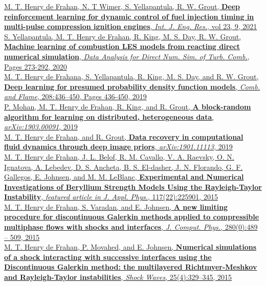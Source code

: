 \documentclass[11pt,letterpaper]{article}
\begin{document}
\href{https://doi.org/10.1177/14680874211019345}{M. T. Henry de Frahan, N. T Wimer, S. Yellapantula, R. W. Grout, \textbf{Deep reinforcement learning for dynamic control of fuel injection timing in multi-pulse compression ignition engines}, \textit{Int. J. Eng. Res.}, vol 23, 9, 2021}\\[2ex]
\href{https://link.springer.com/chapter/10.1007/978-3-030-44718-2_14}{S. Yellapantula, M. T. Henry de Frahan, R. King, M. S. Day, R. W. Grout, \textbf{Machine learning of combustion LES models from reacting direct numerical simulation}, \textit{Data Analysis for Direct Num. Sim. of Turb. Comb.}, Pages 273-292, 2020}\\[2ex]
\href{https://doi.org/10.1016/j.combustflame.2019.07.015}{M. T. Henry de Frahana, S. Yellapantula, R. King, M. S. Day, and R. W. Grout, \textbf{Deep learning for presumed probability density function models}, \textit{Comb. and Flame}, 208:436--450, Pages 436-450, 2019}\\[2ex]%
\href{http://arxiv.org/abs/1903.00091}{P. Mohan, M. T. Henry de Frahan, R. King, and R. Grout, \textbf{A block-random algorithm for learning on distributed, heterogeneous data}, \textit{arXiv:1903.00091}, 2019}\\[2ex]%
\href{http://arxiv.org/abs/1901.11113}{M. T. Henry de Frahan, and R. Grout, \textbf{Data recovery in computational fluid dynamics through deep image priors}, \textit{arXiv:1901.11113}, 2019}\\[2ex]%
\href{http://dx.doi.org/10.1063/1.4922336}{M. T. Henry de Frahan, J. L. Belof, R. M. Cavallo, V. A. Raevsky, O. N. Ignatova, A. Lebedev, D. S. Ancheta, B. S. El-dasher, J. N. Florando, G. F. Gallegos, E. Johnsen, and M. M. LeBlanc, \textbf{Experimental and Numerical Investigations of Beryllium Strength Models Using the Rayleigh-Taylor Instability}, \textit{featured article in J. Appl. Phys.}, 117(22):225901, 2015}\\[2ex]%
\href{http://dx.doi.org/10.1016/j.jcp.2014.09.030}{M. T. Henry de Frahan, S. Varadan, and E. Johnsen, \textbf{A new limiting procedure for discontinuous Galerkin methods applied to compressible multiphase flows with shocks and interfaces}, \textit{J. Comput. Phys.}, 280(0):489 -- 509, 2015}\\[2ex]%
\href{http://dx.doi.org/10.1007/s00193-014-0539-y}{M. T. Henry de Frahan, P. Movahed, and E. Johnsen, \textbf{Numerical simulations of a shock interacting with successive interfaces using the Discontinuous Galerkin method: the multilayered Richtmyer-Meshkov and Rayleigh-Taylor instabilities}, \textit{Shock Waves}, 25(4):329--345, 2015}\\[2ex]%
\end{document}
